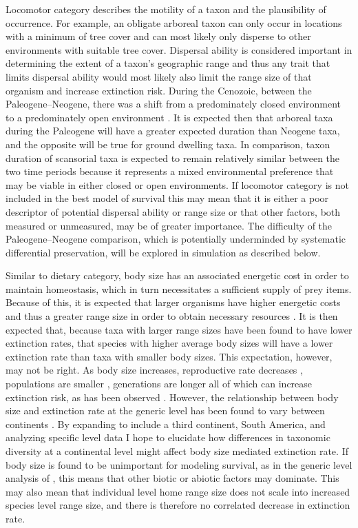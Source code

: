 \documentclass[12pt,letterpaper]{article}
\begin{document}
Locomotor category describes the motility of a taxon and the plausibility of occurrence. For example, an obligate arboreal taxon can only occur in locations with a minimum of tree cover and can most likely only disperse to other environments with suitable tree cover. Dispersal ability is considered important in determining the extent of a taxon's geographic range \citep{Birand2012,Jablonski2006a,Gaston2009} and thus any trait that limits dispersal ability would most likely also limit the range size of that organism and increase extinction risk. During the Cenozoic, between the Paleogene--Neogene, there was a shift from a predominately closed environment to a predominately open environment \citep{Janis1993a,Blois2009,Rose2006}. It is expected then that arboreal taxa during the Paleogene will have a greater expected duration than Neogene taxa, and the opposite will be true for ground dwelling taxa. In comparison, taxon duration of scansorial taxa is expected to remain relatively similar between the two time periods because it represents a mixed environmental preference that may be viable in either closed or open environments. If locomotor category is not included in the best model of survival this may mean that it is either a poor descriptor of potential dispersal ability or range size or that other factors, both measured or unmeasured, may be of greater importance. The difficulty of the Paleogene--Neogene comparison, which is potentially underminded by systematic differential preservation, will be explored in simulation as described below.

Similar to dietary category, body size has an associated energetic cost in order to maintain homeostasis, which in turn necessitates a sufficient supply of prey items. Because of this, it is expected that larger organisms have higher energetic costs and thus a greater range size in order to obtain necessary resources \citep{Damuth1979,Brown1987,Damuth1979,Lyons2010}. It is then expected that, because taxa with larger range sizes have been found to have lower extinction rates, that species with higher average body sizes will have a lower extinction rate than taxa with smaller body sizes. This expectation, however, may not be right. As body size increases, reproductive rate decreases \citep{Johnson2002b}, populations are smaller \citep{White2007}, generations are longer \citep{Martin1993a} all of which can increase extinction risk, as has been observed \citep{Liow2008,Davidson2012}. However, the relationship between body size and extinction rate at the generic level has been found to vary between continents \citep{Tomiya2013,Liow2008}. By expanding to include a third continent, South America, and analyzing specific level data I hope to elucidate how differences in taxonomic diversity at a continental level might affect body size mediated extinction rate. If body size is found to be unimportant for modeling survival, as in the generic level analysis of \citet{Tomiya2013}, this means that other biotic or abiotic factors may dominate. This may also mean that individual level home range size does not scale into increased species level range size, and there is therefore no correlated decrease in extinction rate. 
\end{document}
